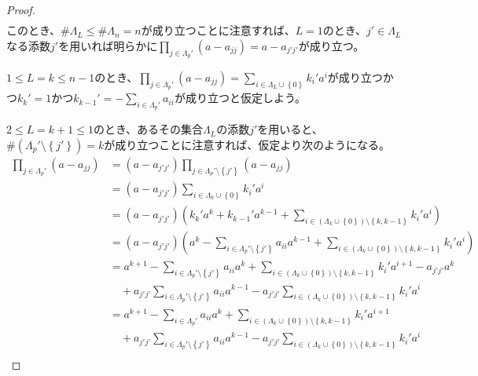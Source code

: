 \documentclass[dvipdfmx]{jsarticle}
\begin{document}
\begin{proof}
\begin{align*}
\end{align*}
このとき、$\# \varLambda_{L} \leq \# \varLambda_{n} = n$が成り立つことに注意すれば、$L = 1$のとき、$j' \in \varLambda_{L}$なる添数$j'$を用いれば明らかに$\prod_{j \in \varLambda_{p}'} \left( a - a_{jj} \right) = a - a_{j'j'}$が成り立つ。\par
$1 \leq L = k \leq n - 1$のとき、$\prod_{j \in \varLambda_{p}'} \left( a - a_{jj} \right) = \sum_{i \in \varLambda_{L} \cup \left\{ 0 \right\}} {k_{i}'a^{i}}$が成り立つかつ$k_{k}' = 1$かつ$k_{k - 1}' = - \sum_{i \in \varLambda_{p}'} a_{ii}$が成り立つと仮定しよう。\par
$2 \leq L = k + 1 \leq 1$のとき、あるその集合$\varLambda_{L}$の添数$j'$を用いると、$\# \left( \varLambda_{p}' \setminus \left\{ j' \right\} \right) = k$が成り立つことに注意すれば、仮定より次のようになる。
\begin{align*}
\prod_{j \in \varLambda_{p}'} \left( a - a_{jj} \right) &= \left( a - a_{j'j'} \right)\prod_{j \in \varLambda_{p}' \setminus \left\{ j' \right\}} \left( a - a_{jj} \right)\\
&= \left( a - a_{j'j'} \right)\sum_{i \in \varLambda_{k} \cup \left\{ 0 \right\}} {k_{i}'a^{i}}\\
&= \left( a - a_{j'j'} \right)\left( k_{k}'a^{k} + k_{k - 1}'a^{k - 1} + \sum_{i \in \left( \varLambda_{k} \cup \left\{ 0 \right\} \right) \setminus \left\{ k,k - 1 \right\}} {k_{i}'a^{i}} \right)\\
&= \left( a - a_{j'j'} \right)\left( a^{k} - \sum_{i \in \varLambda_{p}' \setminus \left\{ j' \right\}} a_{ii}a^{k - 1} + \sum_{i \in \left( \varLambda_{k} \cup \left\{ 0 \right\} \right) \setminus \left\{ k,k - 1 \right\}} {k_{i}'a^{i}} \right)\\
&= a^{k + 1} - \sum_{i \in \varLambda_{p}' \setminus \left\{ j' \right\}} a_{ii}a^{k} + \sum_{i \in \left( \varLambda_{k} \cup \left\{ 0 \right\} \right) \setminus \left\{ k,k - 1 \right\}} {k_{i}'a^{i + 1}} - a_{j'j'}a^{k} \\
&\quad + a_{j'j'}\sum_{i \in \varLambda_{p}' \setminus \left\{ j' \right\}} a_{ii}a^{k - 1} - a_{j'j'}\sum_{i \in \left( \varLambda_{k} \cup \left\{ 0 \right\} \right) \setminus \left\{ k,k - 1 \right\}} {k_{i}'a^{i}}\\
&= a^{k + 1} - \sum_{i \in \varLambda_{p}'} a_{ii}a^{k} + \sum_{i \in \left( \varLambda_{k} \cup \left\{ 0 \right\} \right) \setminus \left\{ k,k - 1 \right\}} {k_{i}'a^{i + 1}} \\
&\quad + a_{j'j'}\sum_{i \in \varLambda_{p}' \setminus \left\{ j' \right\}} a_{ii}a^{k - 1} - a_{j'j'}\sum_{i \in \left( \varLambda_{k} \cup \left\{ 0 \right\} \right) \setminus \left\{ k,k - 1 \right\}} {k_{i}'a^{i}}\\

\end{align*}
\end{proof}
\end{document}
